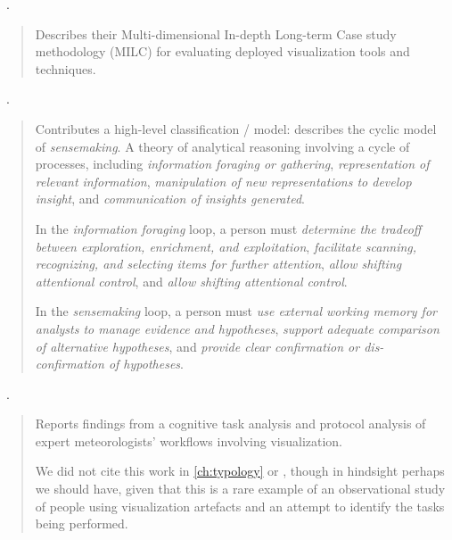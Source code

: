 \begin{sloppypar}
~\cite{Shneiderman2006}. \end{sloppypar}

\begin{quotation}
    Describes their Multi-dimensional In-depth Long-term Case study methodology (MILC) for evaluating deployed visualization tools and techniques.
\end{quotation}

\begin{sloppypar}
~\cite{Pirolli2005}. \end{sloppypar}

\begin{quotation}
    Contributes a high-level classification / model: describes the cyclic model of {\it sensemaking}.
    A theory of analytical reasoning involving a cycle of processes, including {\it information foraging or gathering}, {\it representation of relevant information}, {\it manipulation of new representations to develop insight}, and {\it communication of insights generated}.
    
    In the {\it information foraging} loop, a person must {\it determine the tradeoff between exploration, enrichment, and exploitation}, {\it facilitate scanning, recognizing, and selecting items for further attention}, {\it allow shifting attentional control}, and {\it allow shifting attentional control}.
    
    In the {\it sensemaking} loop, a person must {\it use external working memory for analysts to manage evidence and hypotheses}, {\it support adequate comparison of alternative hypotheses}, and {\it provide clear confirmation or dis-confirmation of hypotheses}.
    
\end{quotation}

\begin{sloppypar}
~\cite{Trafton2000}. \end{sloppypar}

\begin{quotation}
    Reports findings from a cognitive task analysis and protocol analysis of expert meteorologists' workflows involving visualization. 
    
    We did not cite this work in \autoref{ch:typology} or \citet{Brehmer2013}, though in hindsight perhaps we should have, given that this is a rare example of an observational study of people using  visualization artefacts and an attempt to identify the tasks being performed.
\end{quotation}

